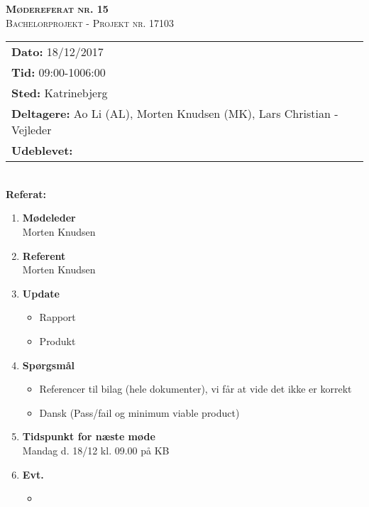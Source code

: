 
\newcommand{\HRule}{\rule{\linewidth}{0.1mm}}


	\begin{center}
		{\huge \bfseries \textsc{Mødereferat nr. 15}}\\
		\textsc{\large Bachelorprojekt - Projekt nr. 17103}\\[0.3cm]
	\end{center}
	\begin{tabular}{ll}
	\large \textbf{Dato:} 18/12/2017  	\\ %
	\large \textbf{Tid:}  09:00-1006:00 	\\ %
	\large \textbf{Sted:} Katrinebjerg		\\ %
	\large \textbf{Deltagere:} Ao Li (AL), Morten Knudsen (MK), Lars Christian - Vejleder \\
	\large \textbf{Udeblevet:} 
	\end{tabular}\\
	\phantom{\,}\hspace{0.1em} \large \textbf{Referat:}
	\begin{enumerate}
		\itemsep 0.3em 
		\item \textbf{Mødeleder}\\
			Morten Knudsen
		\item \textbf{Referent}\\
			Morten Knudsen

		\item \textbf{Update}
			\begin{itemize}[-]
				\item Rapport 
				\item Produkt			
			\end{itemize}
		
							
		\item \textbf{Spørgsmål}
			\begin{itemize}[-]
				\item Referencer til bilag (hele dokumenter), vi får at vide det ikke er korrekt
				\item Dansk (Pass/fail og minimum viable product)
					
			\end{itemize}
	
		\item \textbf{Tidspunkt for næste møde} \\
			Mandag d. 18/12 kl. 09.00 på KB \\
						
		\item \textbf{Evt.}
			\begin{itemize}[-]
				\item 
			\end{itemize}
			
	\end{enumerate}
